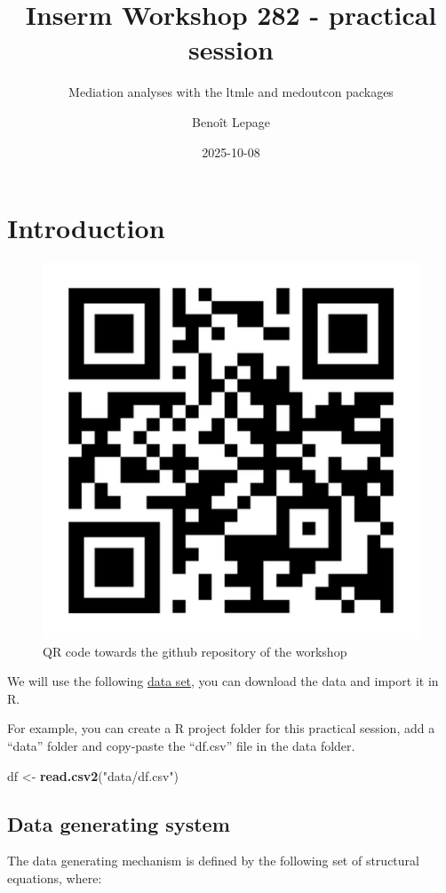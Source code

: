 \documentclass[
]{book}
\title{Inserm Workshop 282 - practical session}
\subtitle{Mediation analyses with the ltmle and medoutcon packages}
\author{Benoît Lepage}
\date{2025-10-08}
\newenvironment{Shaded}{\begin{snugshade}}{\end{snugshade}}
\newcommand{\FunctionTok}[1]{\textcolor[rgb]{0.13,0.29,0.53}{\textbf{#1}}}
\newcommand{\NormalTok}[1]{#1}
\newcommand{\OtherTok}[1]{\textcolor[rgb]{0.56,0.35,0.01}{#1}}
\newcommand{\StringTok}[1]{\textcolor[rgb]{0.31,0.60,0.02}{#1}}
\begin{document}
\maketitle

{
\setcounter{tocdepth}{1}
\tableofcontents
}
\chapter{Introduction}\label{introduction}

\begin{figure}

{\centering \includegraphics[width=0.3\linewidth]{./images/url} 

}

\caption{QR code towards the github repository of the workshop}\label{fig:qrcode}
\end{figure}

We will use the following \href{https://github.com/benoitlepage/Inserm_workshop_282/blob/main/data/df.csv}{data set}, you can download the data and import it in R.

For example, you can create a R project folder for this practical session, add a ``data'' folder and copy-paste the ``df.csv'' file in the data folder.

\begin{Shaded}
\begin{Highlighting}[]
\NormalTok{df }\OtherTok{\textless{}{-}} \FunctionTok{read.csv2}\NormalTok{(}\StringTok{"data/df.csv"}\NormalTok{)}
\end{Highlighting}
\end{Shaded}

\section{Data generating system}\label{data-generating-system}

The data generating mechanism is defined by the following set of structural equations, where:
\end{document}

